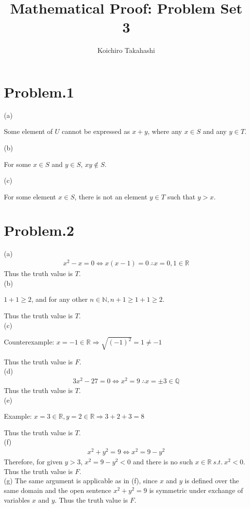 \documentclass[12pt]{article}
\begin{document}
\title{Mathematical Proof: Problem Set 3}
\author{Koichiro Takahashi}
\maketitle 

\section*{Problem.1}
(a)
\begin{center}
Some element of $U$ cannot be expressed as $x+y$, where any $x \in S$ and any $y \in T$.
\end{center}
(b)
\begin{center}
For some $x \in S$ and $y \in S$, $xy \notin S$.
\end{center}
(c)
\begin{center}
For some element $x \in S$, there is not an element $y \in T$ such that $y > x$.
\end{center}
\section*{Problem.2}
(a)
\begin{gather*}
x^2-x=0 \Leftrightarrow x(x-1)=0~\therefore x=0,1 \in \mathbb{R}
\end{gather*}
Thus the truth value is $T$.\\[1em]
(b)
\begin{center}
$1+1 \geq 2$, and for any other $n \in \mathbb{N}, n+1 \geq 1+1 \geq 2$.
\end{center}
Thus the truth value is $T$.\\[1em]
(c)
\begin{center}
Counterexample: $x = -1 \in \mathbb{R} \Rightarrow \sqrt{(-1)^2} = 1 \neq -1$
\end{center}
Thus the truth value is $F$.\\[1em]
(d)
\begin{gather*}
3 x^2 - 27 = 0 \Leftrightarrow x^2 = 9~\therefore x= \pm 3 \in \mathbb{Q}
\end{gather*}
Thus the truth value is $T$.\\[1em]
(e)
\begin{center}
Example: $x = 3 \in \mathbb{R}, y = 2 \in \mathbb{R} \Rightarrow 3 + 2 + 3 = 8$
\end{center}
Thus the truth value is $T$.\\[1em]
(f)
\begin{gather*}
x^2 + y^2 = 9 \Leftrightarrow x^2 = 9 - y^2
\end{gather*}
Therefore, for given $y > 3$, $x^2 = 9 - y^2 < 0$ and there is no such $x \in \mathbb{R}~s.t.~x ^2 < 0$.
Thus the truth value is $F$.\\[1em]
(g)
The same argument is applicable as in (f), since $x$ and $y$ is defined over the same domain and the open sentence $x^2 + y^2 = 9$ is symmetric under exchange of variables $x$ and $y$.
Thus the truth value is $F$.
\end{document}
